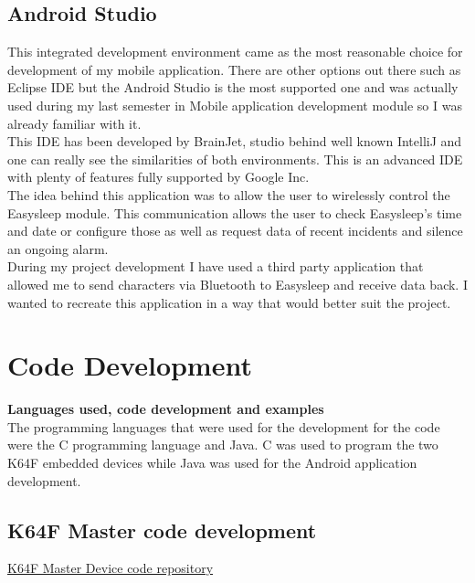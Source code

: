 \documentclass[12pt,a4paper]{article}
\begin{document}
		\subsection{Android Studio} 
		
		
		This integrated development environment came as the most reasonable choice for development of my mobile application. There are other options out there such as Eclipse IDE but the Android Studio is the most supported one and was actually used during my last semester in Mobile application development module so I was already familiar with it.\\ 
		
		This IDE has been developed by BrainJet, studio behind well known IntelliJ and one can really see the similarities of both environments. This is an advanced IDE with plenty of features fully supported by Google Inc.\\ 
		
		The idea behind this application was to allow the user to wirelessly control the Easysleep module. This communication allows the user to check Easysleep's time and date or configure those as well as request data of recent incidents and silence an ongoing alarm.\\
		
		During my project development I have used a third party application that allowed me to send characters via Bluetooth to Easysleep and receive data back. I wanted to recreate this application in a way that would better suit the project.\\ 
		\newpage
		
		\section{Code Development}
		{\bfseries Languages used, code development and examples}\\
		
		The programming languages that were used for the development for the code were the C programming language and Java. C was used to program the two K64F embedded devices while Java was used for the Android application development.
		
		\subsection{K64F Master code development}
		\href{https://github.com/zedd-1983/project_journal/tree/bt2}{K64F Master Device code repository}\\
		
\end{document}
